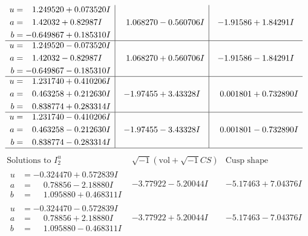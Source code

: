 \documentclass[1p]{elsarticle_modified}
\theoremstyle{definition}
\newcommand{\I}{\sqrt{-1}}
\begin{document}
$$\begin{array}{c|c|c}
\begin{aligned}
u &= \phantom{-}1.249520 + 0.073520 I \\
a &= \phantom{-}1.42032 + 0.82987 I \\
b &= -0.649867 + 0.185310 I\end{aligned}
 & \phantom{-}1.068270 - 0.560706 I & -1.91586 + 1.84291 I \\ \hline\begin{aligned}
u &= \phantom{-}1.249520 - 0.073520 I \\
a &= \phantom{-}1.42032 - 0.82987 I \\
b &= -0.649867 - 0.185310 I\end{aligned}
 & \phantom{-}1.068270 + 0.560706 I & -1.91586 - 1.84291 I \\ \hline\begin{aligned}
u &= \phantom{-}1.231740 + 0.410206 I \\
a &= \phantom{-}0.463258 + 0.212630 I \\
b &= \phantom{-}0.838774 + 0.283314 I\end{aligned}
 & -1.97455 + 3.43328 I & \phantom{-}0.001801 + 0.732890 I \\ \hline\begin{aligned}
u &= \phantom{-}1.231740 - 0.410206 I \\
a &= \phantom{-}0.463258 - 0.212630 I \\
b &= \phantom{-}0.838774 - 0.283314 I\end{aligned}
 & -1.97455 - 3.43328 I & \phantom{-}0.001801 - 0.732890 I\\
 \hline 
 \end{array}$$\newpage$$\begin{array}{c|c|c}  
\text{Solutions to }I^u_{2}& \I (\text{vol} + \sqrt{-1}CS) & \text{Cusp shape}\\
 \hline 
\begin{aligned}
u &= -0.324470 + 0.572839 I \\
a &= \phantom{-}0.78856 - 2.18880 I \\
b &= \phantom{-}1.095880 + 0.468311 I\end{aligned}
 & -3.77922 - 5.20044 I & -5.17463 + 7.04376 I \\ \hline\begin{aligned}
u &= -0.324470 - 0.572839 I \\
a &= \phantom{-}0.78856 + 2.18880 I \\
b &= \phantom{-}1.095880 - 0.468311 I\end{aligned}
 & -3.77922 + 5.20044 I & -5.17463 - 7.04376 I \\ \hline\begin{aligned}

\end{aligned}
\end{array}$$
\end{document}
